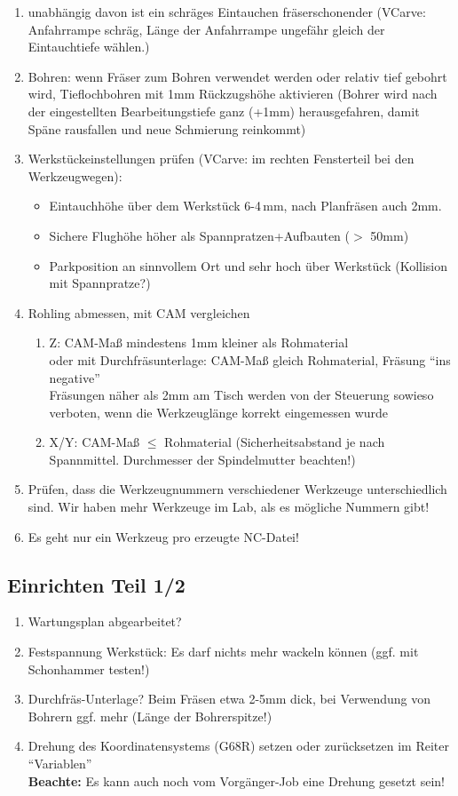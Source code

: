 \documentclass{\basedir/fablab-document}
\renewcommand{\todo}[1]{\colorbox{yellow}{{#1}}}
\begin{document}
\begin{enumerate}
	\item unabhängig davon ist ein schräges Eintauchen fräserschonender (VCarve: Anfahrrampe schräg, Länge der Anfahrrampe ungefähr gleich der Eintauchtiefe wählen.)
	\item Bohren: wenn Fräser zum Bohren verwendet werden oder relativ tief gebohrt wird, Tieflochbohren mit 1mm Rückzugshöhe aktivieren (Bohrer wird nach der eingestellten Bearbeitungstiefe ganz (+1mm) herausgefahren, damit Späne rausfallen und neue Schmierung reinkommt)
	\item Werkstückeinstellungen prüfen (VCarve: im rechten Fensterteil bei den Werkzeugwegen):
\begin{itemize}
	\item Eintauchhöhe über dem Werkstück 6-4\,mm, nach Planfräsen auch 2mm.
	\item Sichere Flughöhe höher als Spannpratzen+Aufbauten ($>$ 50mm)
	\item Parkposition an sinnvollem Ort und sehr hoch über Werkstück (Kollision mit Spannpratze?)
\end{itemize}
	\item Rohling abmessen, mit CAM vergleichen
 \begin{enumerate}
	\item Z: CAM-Maß mindestens 1mm kleiner als Rohmaterial \\
        oder mit Durchfräsunterlage: CAM-Maß gleich Rohmaterial, Fräsung \enquote{ins negative}\\
        Fräsungen näher als 2mm am Tisch werden von der Steuerung sowieso verboten, wenn die Werkzeuglänge korrekt eingemessen wurde
	\item X/Y: CAM-Maß $\leq$ Rohmaterial (Sicherheitsabstand je nach Spannmittel. Durchmesser der Spindelmutter beachten!)
 \end{enumerate}
	\item Prüfen, dass die Werkzeugnummern verschiedener Werkzeuge unterschiedlich sind. Wir haben mehr Werkzeuge im Lab, als es mögliche Nummern gibt!
	\item Es geht nur ein Werkzeug pro erzeugte NC-Datei!%
\end{enumerate}

\subsection{Einrichten Teil 1/2} \label{einrichten}
\begin{enumerate}
	\item Wartungsplan abgearbeitet?
	\item Festspannung Werkstück: Es darf nichts mehr wackeln können (ggf. mit Schonhammer testen!)
	\item Durchfräs-Unterlage? Beim Fräsen etwa 2-5mm dick, bei Verwendung von Bohrern ggf. mehr (Länge der Bohrerspitze!)
	\item Drehung des Koordinatensystems (G68R) setzen oder zurücksetzen im Reiter \enquote{Variablen}\\ \textbf{Beachte:} Es kann auch noch vom Vorgänger-Job eine Drehung gesetzt sein!
\end{enumerate}
\end{document}
